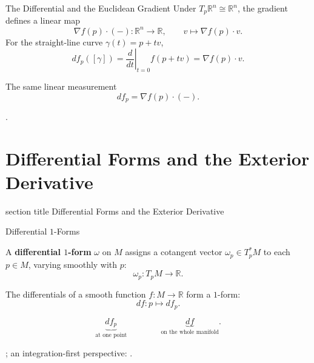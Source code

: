 \documentclass[aspectratio=169,11pt]{beamer}
\newcommand{\slidetitlesection}[1]{%
  \section{#1}%
  \begin{frame}
    \vfill
    \begin{beamercolorbox}[sep=12pt,center,wd=\paperwidth]{section title}
      \usebeamerfont{section title}\insertsectionnumber\quad #1
    \end{beamercolorbox}
    \vfill
  \end{frame}%
}
\newcommand{\sources}[1]{\par\vfill{\scriptsize\color{black!75}#1\par}}
\begin{document}
\begin{frame}{The Differential and the Euclidean Gradient}
  Under $T_p\mathbb{R}^n\cong\mathbb{R}^n$, the gradient defines a linear map
  \begin{equation}
    \nabla f(p)\cdot(-)\colon\mathbb{R}^n\to\mathbb{R},
    \qquad v\mapsto\nabla f(p)\cdot v.
  \end{equation}
  For the straight-line curve $\gamma(t)=p+tv$,
  \begin{equation}
    df_p([\gamma])
    =\left.\frac{d}{dt}\right|_{t=0}f(p+tv)
    =\nabla f(p)\cdot v.
  \end{equation}
  \begin{block}{The same linear measurement}
    \begin{equation}
      df_p=\nabla f(p)\cdot(-).
    \end{equation}
  \end{block}
  \sources{\cite[Chapter~11]{lee2013smooth}.}
\end{frame}

\slidetitlesection{Differential Forms and the Exterior Derivative}

\begin{frame}{Differential $1$-Forms}
  \begin{definition}
    A \textbf{differential $1$-form} $\omega$ on $M$ assigns a cotangent vector
    $\omega_p\in T_p^*M$ to each $p\in M$, varying smoothly with $p$:
    \begin{equation}
      \omega_p\colon T_pM\longrightarrow\mathbb{R}.
    \end{equation}
  \end{definition}
  \begin{example}
    The differentials of a smooth function $f\colon M\to\mathbb{R}$ form a
    $1$-form:
    \begin{equation}
      df\colon p\longmapsto df_p.
    \end{equation}
  \end{example}
  \begin{equation}
    \underbrace{df_p}_{\text{at one point}}
    \qquad\qquad
    \underbrace{df}_{\text{on the whole manifold}}.
  \end{equation}
  \sources{\cite[p.~360]{lee2013smooth}; an integration-first perspective:
    \cite{tao2007differential}.}
\end{frame}
\end{document}
